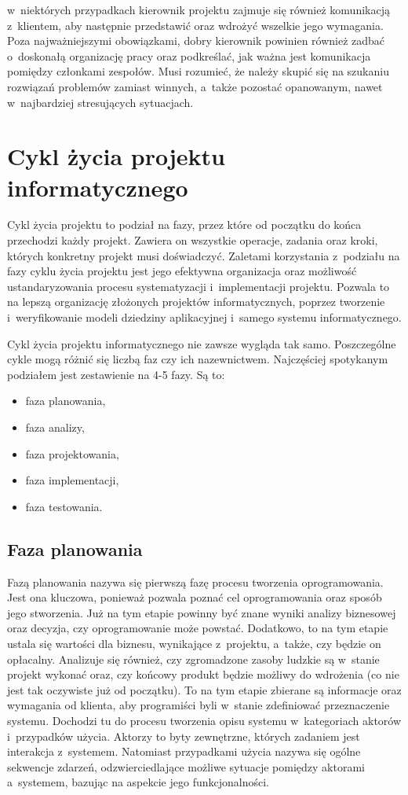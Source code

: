 \documentclass[oneside,polski,logo]{amuthesis}
\begin{document}
w~niektórych przypadkach kierownik projektu zajmuje się również komunikacją z~klientem, aby następnie przedstawić oraz wdrożyć wszelkie jego wymagania. Poza najważniejszymi obowiązkami, dobry kierownik powinien również zadbać o~doskonałą organizację pracy oraz podkreślać, jak ważna jest komunikacja pomiędzy członkami zespołów. Musi rozumieć, że należy skupić się na szukaniu rozwiązań problemów zamiast winnych, a~także pozostać opanowanym, nawet w~najbardziej stresujących sytuacjach.

\section{Cykl życia projektu informatycznego}
Cykl życia projektu to podział na fazy, przez które od początku do końca przechodzi każdy projekt. Zawiera on wszystkie operacje, zadania oraz kroki, których konkretny projekt musi doświadczyć. Zaletami korzystania z~podziału na fazy cyklu życia projektu jest jego efektywna organizacja oraz możliwość ustandaryzowania procesu systematyzacji i~implementacji projektu. Pozwala to na lepszą organizację złożonych projektów informatycznych, poprzez tworzenie i~weryfikowanie modeli dziedziny aplikacyjnej i~samego systemu informatycznego. \cite{IO- Helion}

Cykl życia projektu informatycznego nie zawsze wygląda tak samo. Poszczególne cykle mogą różnić się liczbą faz czy ich nazewnictwem. Najczęściej spotykanym podziałem jest zestawienie na 4-5 fazy. \cite{zarzadzanie5} Są to:

\begin{itemize}
	\item faza planowania,
	\item faza analizy,
	\item faza projektowania,
	\item faza implementacji,
	\item faza testowania. 
\end{itemize}

\subsection {Faza planowania}
Fazą planowania nazywa się pierwszą fazę procesu tworzenia oprogramowania. Jest ona kluczowa, ponieważ pozwala poznać cel oprogramowania oraz sposób jego stworzenia. Już na tym etapie powinny być znane wyniki analizy biznesowej oraz decyzja, czy oprogramowanie może powstać. Dodatkowo, to na tym etapie ustala się wartości dla biznesu, wynikające z~projektu, a~także, czy będzie on opłacalny. Analizuje się również, czy zgromadzone zasoby ludzkie są w~stanie projekt wykonać oraz, czy końcowy produkt będzie możliwy do wdrożenia (co nie jest tak oczywiste już od początku). To na tym etapie zbierane są informacje oraz wymagania od klienta, aby programiści byli w~stanie zdefiniować przeznaczenie systemu. Dochodzi tu do procesu tworzenia opisu systemu w~kategoriach aktorów i~przypadków użycia. Aktorzy to byty zewnętrzne, których zadaniem jest interakcja z~systemem. Natomiast przypadkami użycia nazywa się ogólne sekwencje zdarzeń, odzwierciedlające możliwe sytuacje pomiędzy aktorami a~systemem, bazując na aspekcie jego funkcjonalności.
\end{document}
